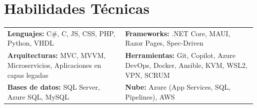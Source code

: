 \section*{Habilidades Técnicas}
\begin{tabularx}{\textwidth}{X X}
\textbf{Lenguajes:} C\#, C, JS, CSS, PHP, Python, VHDL & 
\textbf{Frameworks:} .NET Core, MAUI, Razor Pages, Spec-Driven \\

\textbf{Arquitecturas:} MVC, MVVM, Microservicios, Aplicaciones en capas legadas & 
\textbf{Herramientas:} Git, Copilot, Azure DevOps, Docker, Ansible, KVM, WSL2, VPN, SCRUM \\
\textbf{Bases de datos:} SQL Server, Azure SQL, MySQL &
\textbf{Nube:} Azure (App Services, SQL, Pipelines), AWS \\
\end{tabularx}
